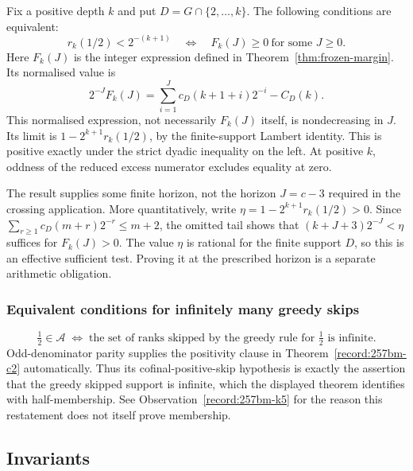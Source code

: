 \begin{thm}\label{record:257bm-c19}
Fix a positive depth $k$ and put $D=G\cap\{2,\ldots,k\}$.
The following conditions are equivalent:
\[
 r_k(1/2)<2^{-(k+1)}
 \quad\Longleftrightarrow\quad
 F_k(J)\ge0\ \text{for some }J\ge0.
\]
Here $F_k(J)$ is the integer expression defined in
Theorem~\ref{thm:frozen-margin}.  Its normalised value is
\[
 2^{-J}F_k(J)=\sum_{i=1}^{J}c_D(k+1+i)2^{-i}-C_D(k).
\]
This normalised expression, not necessarily $F_k(J)$ itself, is
nondecreasing in $J$.  Its limit is
$1-2^{k+1}r_k(1/2)$, by the finite-support Lambert identity.
This is positive exactly under the strict dyadic inequality on the left.  At positive $k$, oddness of the
reduced excess numerator excludes equality at zero.

The result supplies some finite horizon, not the horizon $J=c-3$
required in the crossing application.  More quantitatively, write
$\eta=1-2^{k+1}r_k(1/2)>0$.  Since
$\sum_{r\ge1}c_D(m+r)2^{-r}\le m+2$, the omitted tail shows that
$(k+J+3)2^{-J}<\eta$ suffices for $F_k(J)>0$.
The value $\eta$ is rational for the finite support $D$, so this is an
effective sufficient test.  Proving it at the prescribed horizon is a
separate arithmetic obligation.
\end{thm}

\subsubsection*{Equivalent conditions for infinitely many greedy skips}

\begin{thm}\label{record:257bm-c20}
\[
\tfrac12\in\ensuremath{\mathcal A} \;\Longleftrightarrow\; \text{the set of ranks skipped by the greedy rule for }\tfrac12\text{ is infinite}.
\]
Odd-denominator parity supplies the positivity clause in Theorem~\ref{record:257bm-c2} automatically. Thus its
cofinal-positive-skip hypothesis is exactly the assertion that the greedy skipped support is
infinite, which the displayed theorem identifies with half-membership. See Observation~\ref{record:257bm-k5} for the
reason this restatement does not itself prove membership.
\end{thm}

\subsection{Invariants}

